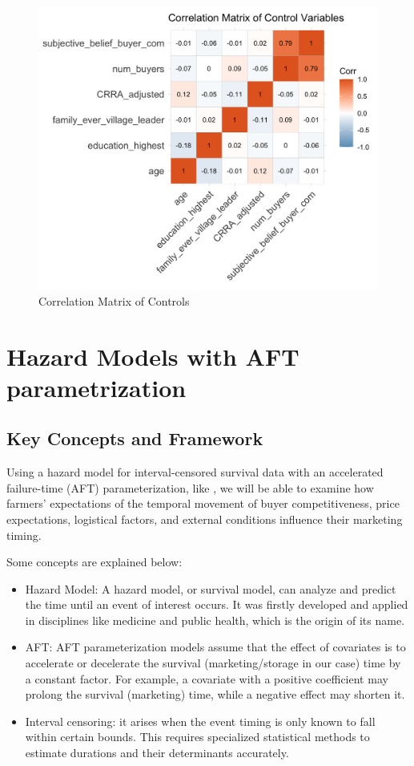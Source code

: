 \documentclass[12pt]{article}
\begin{document}
\newpage
\begin{figure}[H]
\centering
\includegraphics[width=1\textwidth]{figures/correlation_matrix_controls.png}
\caption{Correlation Matrix of Controls}
\label{Figure: Correlation Matrix of Controls}
\end{figure}






\newpage
\section{Hazard Models with AFT parametrization}
\subsection{Key Concepts and Framework}
Using a hazard model for interval-censored survival data with an accelerated failure-time (AFT) parameterization, like \cite{albuquerque2024market}, we will be able to examine how farmers' expectations of the temporal movement of buyer competitiveness, price expectations, logistical factors, and external conditions influence their marketing timing.

Some concepts are explained below:
\begin{itemize}
    \item Hazard Model: A hazard model, or survival model, can analyze and predict the time until an event of interest occurs. It was firstly developed and applied in disciplines like medicine and public health, which is the origin of its name. 
    \item AFT: AFT parameterization models assume that the effect of covariates is to accelerate or decelerate the survival (marketing/storage in our case) time by a constant factor. For example, a covariate with a positive coefficient may prolong the survival (marketing) time, while a negative effect may shorten it.
    \item Interval censoring: it arises when the event timing is only known to fall within certain bounds. This requires specialized statistical methods to estimate durations and their determinants accurately. 
\end{itemize}
\end{document}
